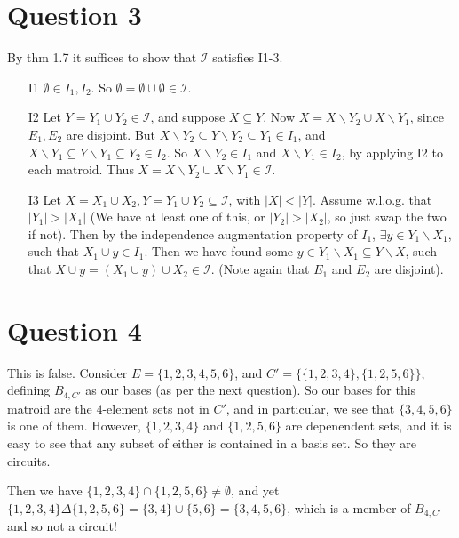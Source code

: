 \documentclass{article}
\begin{document}
\section*{Question 3}
By thm 1.7 it suffices to show that $\mathcal{I}$ satisfies I1-3.
\begin{enumerate}
    \item[I1] $\emptyset\in I_1 ,I_2$. So $\emptyset=\emptyset\cup\emptyset\in\mathcal{I}$.
    \item[I2] Let $Y=Y_1\cup Y_2\in\mathcal{I}$, and suppose $X\subseteq Y$. Now $X=X\backslash Y_2\cup X\backslash Y_1$,
    since $E_1, E_2$ are disjoint.
        But $X\backslash Y_2\subseteq Y\backslash Y_2\subseteq Y_1\in I_1$, and $X\backslash Y_1\subseteq Y\backslash Y_1\subseteq Y_2\in I_2$.
        So  $X\backslash Y_2\in I_1$ and $X\backslash Y_1\in I_2$, by applying I2 to each matroid.
        Thus $X=X\backslash Y_2\cup X\backslash Y_1\in\mathcal{I}$.
    \item[I3] Let $X=X_1\cup X_2, Y=Y_1\cup Y_2\subseteq \mathcal{I}$, with $|X|<|Y|$.
         Assume w.l.o.g. that  $|Y_1|>|X_1|$ (We have at least one of this, or $|Y_2|>|X_2|$, so just swap the two if not).
            Then  by the independence augmentation property of $I_1$, 
         $\exists y\in Y_1\backslash X_1$, such that $X_1\cup y\in I_1$. 
         Then we have found some $y\in Y_1\backslash X_1\subseteq Y\backslash X$,
         such that $X\cup y=(X_1\cup y)\cup X_2\in\mathcal{I}$.
         (Note again that $E_1$ and $E_2$ are disjoint).
\end{enumerate}

\section*{Question 4}
    This is false. Consider $E=\{1, 2, 3, 4, 5, 6\}$, and $C'=\{\{1, 2, 3, 4\}, \{1, 2, 5, 6\}\}$, defining $B_{4, C'}$ as our bases (as per the next question).
    So our bases for this matroid are the $4$-element sets not in $C'$, and in particular, we see that $\{3, 4, 5, 6\}$ is one of them.
    However, $\{1, 2, 3, 4\}$ and $\{1, 2, 5, 6\}$ are depenendent sets, and it is easy to see that any subset of either is contained in a basis set.
    So they are circuits.

    Then we have $\{1, 2, 3, 4\}\cap \{1, 2, 5, 6\}\ne\emptyset$, and yet $\{1, 2, 3, 4\}\Delta\{1, 2, 5, 6\}=\{3, 4\}\cup\{5, 6\}=\{3, 4, 5, 6\}$,
    which is a member of $B_{4, C'}$ and so not a circuit!
\end{document}
